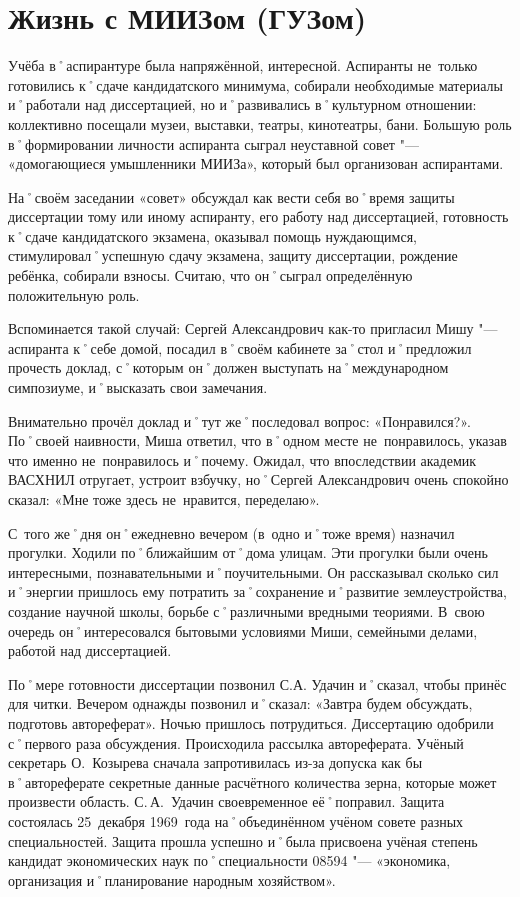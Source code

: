 ﻿\chapter{Жизнь с МИИЗом (ГУЗом)}

Учёба в˚аспирантуре была напряжённой, интересной. Аспиранты не~только готовились к˚сдаче кандидатского минимума, собирали необходимые материалы и˚работали над диссертацией, но и˚развивались в˚культурном отношении: коллективно посещали музеи, выставки, театры, кинотеатры, бани. Большую роль в˚формировании личности аспиранта сыграл неуставной совет "--- «домогающиеся умышленники МИИЗа», который был организован аспирантами. 

На˚своём заседании «совет» обсуждал как вести себя во˚время защиты диссертации тому или иному аспиранту, его работу над диссертацией, готовность к˚сдаче кандидатского экзамена, оказывал помощь нуждающимся, стимулировал˚успешную сдачу экзамена, защиту диссертации, рождение ребёнка, собирали взносы. Считаю, что он˚сыграл определённую положительную роль.

Вспоминается такой случай: Сергей Александрович как-то пригласил Мишу "--- аспиранта к˚себе домой, посадил в˚своём кабинете за˚стол и˚предложил прочесть доклад, с˚которым он˚должен выступать на˚международном симпозиуме, и˚высказать свои замечания.

Внимательно прочёл доклад и˚тут же˚последовал вопрос: «Понравился?». По˚своей наивности, Миша ответил, что в˚одном месте не~понравилось, указав что именно не~понравилось и˚почему. Ожидал, что впоследствии академик ВАСХНИЛ отругает, устроит взбучку, но˚Сергей Александрович очень спокойно сказал: «Мне тоже здесь не~нравится, переделаю».

С~того же˚дня он˚ежедневно вечером (в~одно и˚тоже время) назначил прогулки. Ходили по˚ближайшим от˚дома улицам. Эти прогулки были очень интересными, познавательными и˚поучительными. Он рассказывал сколько сил и˚энергии пришлось ему потратить за˚сохранение и˚развитие землеустройства, создание научной школы, борьбе с˚различными вредными теориями. В~свою очередь он˚интересовался бытовыми условиями Миши, семейными делами, работой над диссертацией.

По˚мере готовности диссертации позвонил С.А. Удачин и˚сказал, чтобы принёс для читки. Вечером однажды позвонил и˚сказал: «Завтра будем обсуждать, подготовь автореферат». Ночью пришлось потрудиться. Диссертацию одобрили с˚первого раза обсуждения. Происходила рассылка автореферата. Учёный секретарь О.~Козырева сначала запротивилась из-за допуска как бы в˚автореферате секретные данные расчётного количества зерна, которые может произвести область. С.\,А.~Удачин своевременное её˚поправил. Защита состоялась 25~декабря 1969~года на˚объединённом учёном совете разных специальностей. Защита прошла успешно и˚была присвоена учёная степень кандидат экономических наук по˚специальности 08594 "--- «экономика, организация и˚планирование народным хозяйством». 

